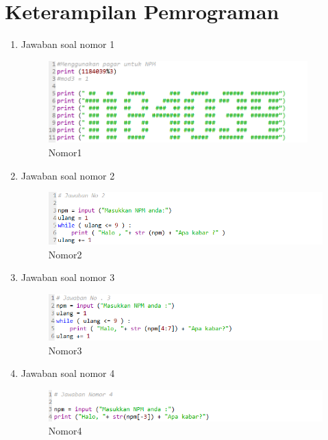 \section{Keterampilan Pemrograman}
\begin{enumerate}
    \item Jawaban soal nomor 1
     \begin{figure}[!htbp]
        \centering
        \includegraphics[width=10cm]{figures/pagarnpm.PNG}
        \caption{Nomor1}
    \end{figure}
    
     \item Jawaban soal nomor 2
     \begin{figure}[!htbp]
        \centering
        \includegraphics[width=12cm]{figures/jwb2.PNG}
        \caption{Nomor2}
    \end{figure}
    
     \item Jawaban soal nomor 3
     \begin{figure}[!htbp]
        \centering
        \includegraphics[width=12cm]{figures/jwb3.PNG}
        \caption{Nomor3}
    \end{figure}
    
     \item Jawaban soal nomor 4
     \begin{figure}[!htbp]
        \centering
        \includegraphics[width=15cm]{figures/jwb4.PNG}
        \caption{Nomor4}
    \end{figure}
    

\end{enumerate}
